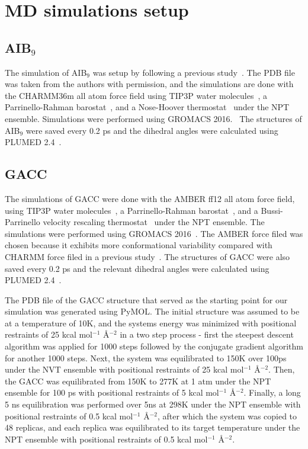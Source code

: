 
\section{MD simulations setup}
\label{ch3:app:setup}
\label{ch3:sec:setup}

\subsection{\texorpdfstring{AIB$_9$}{AIB9}}
The simulation of AIB$_9$ was setup by following a previous study~\cite{SPIB_AIB9}. The PDB file was taken from the authors with permission, and the simulations are done with the CHARMM36m all atom force field \cite{huang2017charmm36m} using TIP3P water molecules~\cite{tip3p}, a Parrinello-Rahman barostat~\cite{Parrinello_Rahman_dynamics}, and a Nose-Hoover thermostat~\cite{hoover, nose--hoover} under the NPT ensemble. Simulations were performed using GROMACS 2016.~\cite{2016gromacs} The structures of AIB$_9$ were saved every 0.2 ps and the dihedral angles were calculated using PLUMED 2.4~\cite{plumed}.

\subsection{GACC}
The simulations of GACC were done with the AMBER ff12 all atom force field, using TIP3P water molecules~\cite{tip3p}, a Parrinello-Rahman barostat~\cite{Parrinello_Rahman_dynamics}, and a Bussi-Parrinello velocity rescaling thermostat~\cite{Bussi_Parrinello_thermostat} under the NPT ensemble. The simulations were performed using GROMACS 2016~\cite{2016gromacs}. The AMBER force filed was chosen because it exhibits more conformational variability compared with CHARMM force filed in a previous study~\cite{Bergonzo2015}. The structures of GACC were also saved every 0.2 ps and the relevant dihedral angles were calculated using PLUMED 2.4~\cite{plumed}.

The PDB file of the GACC structure that served as the starting point for our simulation was generated using PyMOL. The initial structure was assumed to be at a temperature of 10K, and the systems energy was minimized with positional restraints of 25 kcal mol$^{-1}$ \AA$^{-2}$ in a two step process - first the steepest descent algorithm was applied for 1000 steps followed by the conjugate gradient algorithm for another 1000 steps. Next, the system was equilibrated to 150K over 100ps under the NVT ensemble with positional restraints of 25 kcal mol$^{-1}$ \AA$^{-2}$. Then, the GACC was equilibrated from 150K to 277K at 1 atm under the NPT ensemble for 100 ps with positional restraints of 5 kcal mol$^{-1}$ \AA$^{-2}$. Finally, a long 5 ns equilibration was performed over 5ns at 298K under the NPT ensemble with positional restraints of 0.5 kcal mol$^{-1}$ \AA$^{-2}$, after which the system was copied to 48 replicas, and each replica was equilibrated to its target temperature under the NPT ensemble with positional restraints of 0.5 kcal mol$^{-1}$ \AA$^{-2}$.


